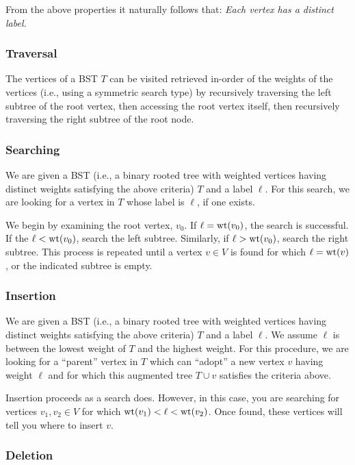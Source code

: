 From the above properties it naturally follows that:
{\it Each vertex has a distinct label.}


\subsubsection{Traversal}

The vertices of a BST $T$ can be visited retrieved in-order of the
weights of the vertices (i.e.,
using a symmetric search type) by recursively  traversing the left subtree of the
root vertex, then accessing the root vertex itself, then recursively traversing the
right subtree of the root node.

\subsubsection{Searching}

We are given a BST (i.e., a binary rooted tree with weighted vertices
having distinct weights satisfying the above criteria) $T$ and a
label $\ell$. For this search, we are looking for a vertex in $T$
whose label is $\ell$, if one exists.

We begin by examining the root vertex, $v_0$. If $\ell={\rm wt}(v_0)$,
the search is successful. If the $\ell<{\rm wt}(v_0)$,
search the left subtree. Similarly, if $\ell>{\rm wt}(v_0)$,
search the right subtree. This process is repeated until a vertex
$v\in V$ is found for which $\ell={\rm wt}(v)$,
or the indicated subtree is empty.


\subsubsection{Insertion}

We are given a BST (i.e., a binary rooted tree with weighted vertices
having distinct weights satisfying the above criteria) $T$ and a
label $\ell$. We assume $\ell$ is between the
lowest weight of $T$ and the highest weight.
For this procedure, we are looking for a ``parent''
vertex in $T$ which can ``adopt'' a new vertex $v$ having weight $\ell$
and for which this augmented tree $T\cup v$ satisfies
the criteria above.

Insertion proceeds as a search does. However, in this case, you are
searching for vertices $v_1,v_2\in V$ for which
${\rm wt}(v_1)<\ell < {\rm wt}(v_2)$. Once found, these
vertices will tell you where to insert $v$.

\subsubsection{Deletion}


